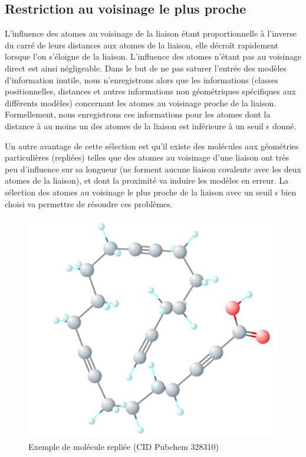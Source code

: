 \subsection{Restriction au voisinage le plus proche}
\par L'influence des atomes au voisinage de la liaison étant proportionnelle à l'inverse du carré de leurs distances aux atomes de la liaison, elle décroît rapidement lorsque l'on s'éloigne de la liaison. L'influence des atomes n'étant pas au voisinage direct est ainsi négligeable. Dans le but de ne pas saturer l'entrée des modèles d'information inutile, nous n'enregistrons alors que les informations (classes positionnelles, distances et autres informations non géométriques spécifiques aux différents modèles) concernant les atomes au voisinage proche de la liaison. Formellement, nous enregistrons ces informations pour les atomes dont la distance à au moins un des atomes de la liaison est inférieure à un seuil $\epsilon$  donné.\\

\par Un autre avantage de cette sélection est qu'il existe des molécules aux géométries particulières (repliées) telles que des atomes au voisinage d'une liaison ont très peu d'influence sur sa longueur (ne forment aucune liaison covalente avec les deux atomes de la liaison), et dont la proximité va induire les modèles en erreur. La sélection des atomes au voisinage le plus proche de la liaison avec un seuil $\epsilon$ bien choisi va permettre de résoudre ces problèmes.

\begin{figure}[!h]
	\centering
	
	\includegraphics[scale=0.25]{images/mol_repliee.png}
	\caption{Exemple de molécule repliée (CID Pubchem 328310)}
\end{figure}